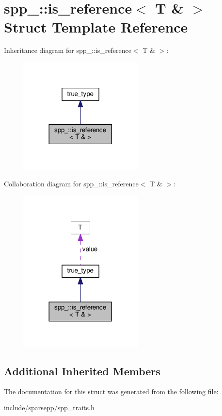\hypertarget{structspp___1_1is__reference_3_01_t_01_6_01_4}{}\section{spp\+\_\+\+:\+:is\+\_\+reference$<$ T \& $>$ Struct Template Reference}
\label{structspp___1_1is__reference_3_01_t_01_6_01_4}


Inheritance diagram for spp\+\_\+\+:\+:is\+\_\+reference$<$ T \& $>$\+:\nopagebreak
\begin{figure}[H]
\begin{center}
\leavevmode
\includegraphics[width=177pt]{structspp___1_1is__reference_3_01_t_01_6_01_4__inherit__graph}
\end{center}
\end{figure}


Collaboration diagram for spp\+\_\+\+:\+:is\+\_\+reference$<$ T \& $>$\+:\nopagebreak
\begin{figure}[H]
\begin{center}
\leavevmode
\includegraphics[width=177pt]{structspp___1_1is__reference_3_01_t_01_6_01_4__coll__graph}
\end{center}
\end{figure}
\subsection*{Additional Inherited Members}


The documentation for this struct was generated from the following file\+:\begin{DoxyCompactItemize}
\item 
include/sparsepp/spp\+\_\+traits.\+h\end{DoxyCompactItemize}

